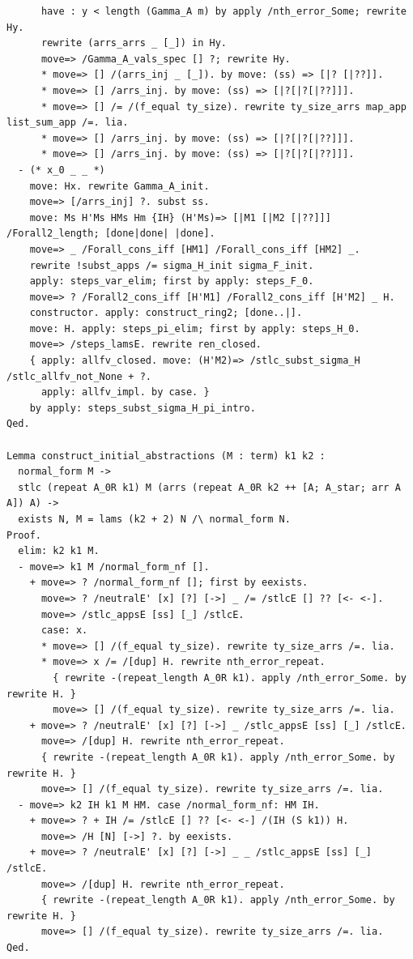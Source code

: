 \documentclass[10pt,a4paper]{amsart}
\begin{document}
\begin{lstlisting}
      have : y < length (Gamma_A m) by apply /nth_error_Some; rewrite Hy.
      rewrite (arrs_arrs _ [_]) in Hy.
      move=> /Gamma_A_vals_spec [] ?; rewrite Hy.
      * move=> [] /(arrs_inj _ [_]). by move: (ss) => [|? [|??]].
      * move=> [] /arrs_inj. by move: (ss) => [|?[|?[|??]]].
      * move=> [] /= /(f_equal ty_size). rewrite ty_size_arrs map_app list_sum_app /=. lia.
      * move=> [] /arrs_inj. by move: (ss) => [|?[|?[|??]]].
      * move=> [] /arrs_inj. by move: (ss) => [|?[|?[|??]]].
  - (* x_0 _ _ *)
    move: Hx. rewrite Gamma_A_init.
    move=> [/arrs_inj] ?. subst ss.
    move: Ms H'Ms HMs Hm {IH} (H'Ms)=> [|M1 [|M2 [|??]]] /Forall2_length; [done|done| |done].
    move=> _ /Forall_cons_iff [HM1] /Forall_cons_iff [HM2] _.
    rewrite !subst_apps /= sigma_H_init sigma_F_init.
    apply: steps_var_elim; first by apply: steps_F_0.
    move=> ? /Forall2_cons_iff [H'M1] /Forall2_cons_iff [H'M2] _ H.
    constructor. apply: construct_ring2; [done..|].
    move: H. apply: steps_pi_elim; first by apply: steps_H_0.
    move=> /steps_lamsE. rewrite ren_closed.
    { apply: allfv_closed. move: (H'M2)=> /stlc_subst_sigma_H /stlc_allfv_not_None + ?.
      apply: allfv_impl. by case. }
    by apply: steps_subst_sigma_H_pi_intro.
Qed.

Lemma construct_initial_abstractions (M : term) k1 k2 :
  normal_form M ->
  stlc (repeat A_0R k1) M (arrs (repeat A_0R k2 ++ [A; A_star; arr A A]) A) ->
  exists N, M = lams (k2 + 2) N /\ normal_form N.
Proof.
  elim: k2 k1 M.
  - move=> k1 M /normal_form_nf [].
    + move=> ? /normal_form_nf []; first by eexists.
      move=> ? /neutralE' [x] [?] [->] _ /= /stlcE [] ?? [<- <-].
      move=> /stlc_appsE [ss] [_] /stlcE.
      case: x.
      * move=> [] /(f_equal ty_size). rewrite ty_size_arrs /=. lia.
      * move=> x /= /[dup] H. rewrite nth_error_repeat.
        { rewrite -(repeat_length A_0R k1). apply /nth_error_Some. by rewrite H. }
        move=> [] /(f_equal ty_size). rewrite ty_size_arrs /=. lia.
    + move=> ? /neutralE' [x] [?] [->] _ /stlc_appsE [ss] [_] /stlcE.
      move=> /[dup] H. rewrite nth_error_repeat.
      { rewrite -(repeat_length A_0R k1). apply /nth_error_Some. by rewrite H. }
      move=> [] /(f_equal ty_size). rewrite ty_size_arrs /=. lia.
  - move=> k2 IH k1 M HM. case /normal_form_nf: HM IH.
    + move=> ? + IH /= /stlcE [] ?? [<- <-] /(IH (S k1)) H.
      move=> /H [N] [->] ?. by eexists.
    + move=> ? /neutralE' [x] [?] [->] _ _ /stlc_appsE [ss] [_] /stlcE.
      move=> /[dup] H. rewrite nth_error_repeat.
      { rewrite -(repeat_length A_0R k1). apply /nth_error_Some. by rewrite H. }
      move=> [] /(f_equal ty_size). rewrite ty_size_arrs /=. lia.
Qed.


\end{lstlisting}
\end{document}
